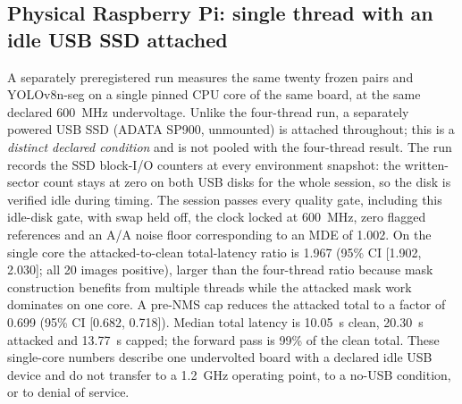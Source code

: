 \subsection{Physical Raspberry Pi: single thread with an idle USB SSD attached}
\label{app:pi3b-pi1}
A separately preregistered run measures the same twenty frozen pairs and YOLOv8n-seg on a single pinned CPU core of the same board, at the same declared 600~MHz undervoltage. Unlike the four-thread run, a separately powered USB SSD (ADATA SP900, unmounted) is attached throughout; this is a \emph{distinct declared condition} and is not pooled with the four-thread result. The run records the SSD block-I/O counters at every environment snapshot: the written-sector count stays at zero on both USB disks for the whole session, so the disk is verified idle during timing. The session passes every quality gate, including this idle-disk gate, with swap held off, the clock locked at 600~MHz, zero flagged references and an A/A noise floor corresponding to an MDE of 1.002. On the single core the attacked-to-clean total-latency ratio is 1.967 (95\% CI [1.902, 2.030]; all 20 images positive), larger than the four-thread ratio because mask construction benefits from multiple threads while the attacked mask work dominates on one core. A pre-NMS cap reduces the attacked total to a factor of 0.699 (95\% CI [0.682, 0.718]). Median total latency is 10.05~s clean, 20.30~s attacked and 13.77~s capped; the forward pass is 99\% of the clean total. These single-core numbers describe one undervolted board with a declared idle USB device and do not transfer to a 1.2~GHz operating point, to a no-USB condition, or to denial of service.
